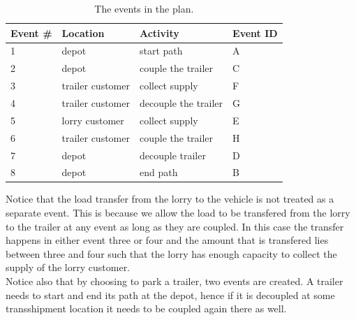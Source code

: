 \begin{table}[!h]
  \centering
  \begin{tabular}{@{}llll@{}} \toprule
    Event \# & Location & Activity & Event ID  \\ \midrule
    1 & depot & start path & A \\
    2 & depot & couple the trailer & C \\
    3 & trailer customer & collect supply & F \\
    4 & trailer customer & decouple the trailer & G \\
    5 & lorry customer & collect supply & E  \\
    6 & trailer customer & couple the trailer & H  \\
    7 & depot & decouple trailer & D  \\
    8 & depot & end path  &  B \\     \bottomrule
  \end{tabular}
  \caption{The events in the plan.}
  \label{tab:events}
\end{table}

Notice that the load transfer from the lorry to the vehicle is not treated as a separate event.
This is because we allow the load to be transfered from the lorry to the trailer at any event as long as they are coupled.
In this case the transfer happens in either event three or four and the amount that is transfered lies between three and four such that the lorry has enough capacity to collect the supply of the lorry customer.\\

Notice also that by choosing to park a trailer, two events are created. A trailer needs to start and end its path at the depot, hence if it is decoupled at some transshipment location it needs to be coupled again there as well. \\






